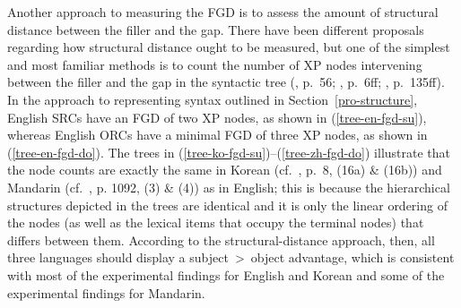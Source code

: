 Another approach to measuring the FGD is to assess the amount of structural distance between the filler and the gap. There have been different proposals regarding how structural distance ought to be measured, but one of the simplest and most familiar methods is to count the number of XP nodes intervening between the filler and the gap in the syntactic tree (\cite{collins1994}, p.~56; \cite{kim2013}, p.~6ff; \cite{ogrady1997}, p.~135ff). In the approach to representing syntax outlined in Section~\ref{pro-structure}, English SRCs have an FGD of two XP nodes, as shown in (\ref{tree-en-fgd-su}), whereas English ORCs have a minimal FGD of three XP nodes, as shown in (\ref{tree-en-fgd-do}). The trees in (\ref{tree-ko-fgd-su})--(\ref{tree-zh-fgd-do})\footnotemark{} illustrate that the node counts are exactly the same in Korean (cf.~\cite{kwon.etal2006}, p.~8, (16a) \& (16b)) and Mandarin (cf.~\cite{sung.etal2016}, p. 1092, (3) \& (4)) as in English; this is because the hierarchical structures depicted in the trees are identical and it is only the linear ordering of the nodes (as well as the lexical items that occupy the terminal nodes) that differs between them. According to the structural-distance approach, then, all three languages should display a subject~>~object advantage, which is consistent with most of the experimental findings for English and Korean and some of the experimental findings for Mandarin. 


\hbox{
}

